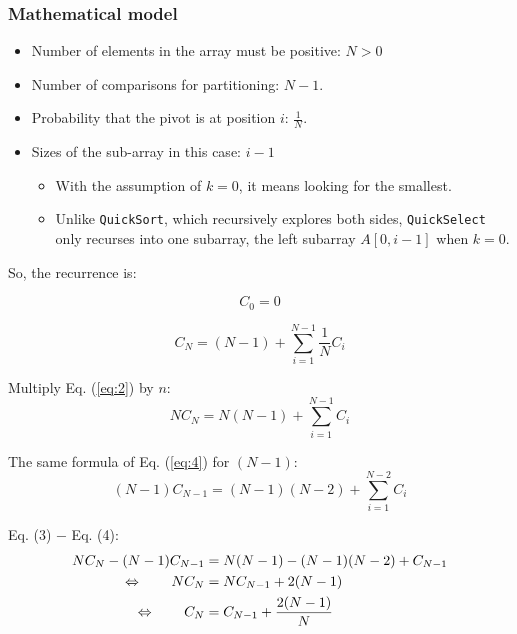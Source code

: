 \documentclass[acmconf,nonacm=true]{acmart}
\begin{document}
\subsubsection{Mathematical model}
    \begin{itemize}
        \item Number of elements in the array must be positive: $N > 0$
        \item Number of comparisons for partitioning: $N - 1$.
        \item Probability that the pivot is at position $i$: $\frac{1}{N}$.
        \item Sizes of the sub-array in this case: $i-1$
        \begin{itemize}
            \item With the assumption of $k=0$, it means looking for the smallest.
            \item Unlike \texttt{QuickSort}, which recursively explores both sides, \texttt{QuickSelect} only recurses into one subarray, the left subarray $A[0, i-1]$ when $k=0$.
        \end{itemize}
    \end{itemize}
    So, the recurrence is:

    \begin{equation}
        C_0 = 0
    \end{equation}

    \begin{equation} \label{eq:2}
        C_N = (N-1) + \sum_{i=1}^{N-1} \frac{1}{N} C_i
    \end{equation}

    Multiply Eq. (\ref{eq:2}) by $n$:
    \begin{equation} \label{eq:3}
        NC_N = N(N-1) + \sum_{i=1}^{N-1} C_i
    \end{equation}

    The same formula of Eq. (\ref{eq:4}) for $(N - 1)$:
    \begin{equation} \label{eq:4}
        (N-1)C_{N-1} = (N-1)(N-2) + \sum_{i=1}^{N-2} C_i
    \end{equation}

    Eq. (3) $-$ Eq. (4):
    \begin{align} 
        NC_N - (N - 1)C_{N-1} &= N (N - 1) - (N - 1)(N - 2) + C_{N-1} \label{eq:5} \\
        \llap{$\Leftrightarrow$ \qquad} NC_N &= NC_{N-1} + 2(N-1) \label{eq:6} \\
        \llap{$\Leftrightarrow$ \qquad} C_N &= C_{N-1} + \frac{2(N-1)}{N}  \label{eq:7}
    \end{align}
\end{document}
